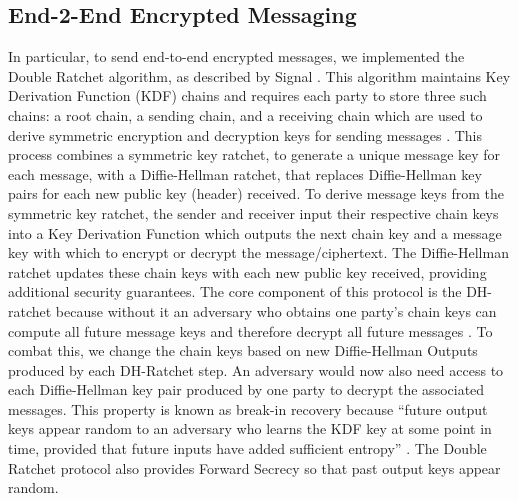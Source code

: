 \documentclass[conference]{IEEEtran}
\begin{document}
\subsection{End-2-End Encrypted Messaging}
In particular, to send end-to-end encrypted messages, we implemented the Double Ratchet algorithm, as described by Signal \cite{https://www.signal.org/docs/specifications/doubleratchet/}. This algorithm maintains Key Derivation Function (KDF) chains and requires each party to store three such chains: a root chain, a sending chain, and a receiving chain which are used to derive symmetric encryption and decryption keys for sending messages \cite{https://www.signal.org/docs/specifications/doubleratchet/}. This process combines a symmetric key ratchet, to generate a unique message key for each message, with a Diffie-Hellman ratchet, that replaces Diffie-Hellman key pairs for each new public key (header) received. To derive message keys from the symmetric key ratchet, the sender and receiver input their respective chain keys into a Key Derivation Function which outputs the next chain key and a message key with which to encrypt or decrypt the message/ciphertext. The Diffie-Hellman ratchet updates these chain keys with each new public key received, providing additional security guarantees. The core component of this protocol is the DH-ratchet because without it an adversary who obtains one party’s chain keys can compute all future message keys and therefore decrypt all future messages \cite{https://www.signal.org/docs/specifications/doubleratchet/}. To combat this, we change the chain keys based on new Diffie-Hellman Outputs produced by each DH-Ratchet step. An adversary would now also need access to each Diffie-Hellman key pair produced by one party to decrypt the associated messages. This property is known as break-in recovery because “future output keys appear random to an adversary who learns the KDF key at some point in time, provided that future inputs have added sufficient entropy” \cite{https://www.signal.org/docs/specifications/doubleratchet/}. The Double Ratchet protocol also provides Forward Secrecy so that past output keys appear random. 
\end{document}
